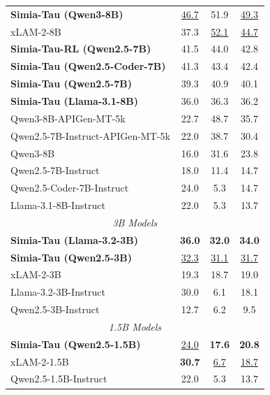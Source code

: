 \begin{table}
{\begin{tabular}{l|ccc}
\textbf{\textcolor{ourmodel}{Simia-Tau (Qwen3-8B)}} & \underline{\textcolor{ourmodel}{46.7}} & 51.9 & \underline{\textcolor{ourmodel}{49.3}} \\
xLAM-2-8B & 37.3 & \underline{52.1} & \underline{44.7} \\
\addlinespace[3pt]
\rowcolor{lightblue}
\textbf{\textcolor{ourmodel}{Simia-Tau-RL (Qwen2.5-7B)}} & \textcolor{ourmodel}{41.5} & \textcolor{ourmodel}{44.0} & \textcolor{ourmodel}{42.8} \\
\rowcolor{lightblue}
\textbf{\textcolor{ourmodel}{Simia-Tau (Qwen2.5-Coder-7B)}} & \textcolor{ourmodel}{41.3} & \textcolor{ourmodel}{43.4} & \textcolor{ourmodel}{42.4} \\
\addlinespace[3pt]
\rowcolor{lightblue}
\textbf{\textcolor{ourmodel}{Simia-Tau (Qwen2.5-7B)}} & \textcolor{ourmodel}{39.3} & \textcolor{ourmodel}{40.9} & \textcolor{ourmodel}{40.1} \\
\addlinespace[3pt]
\rowcolor{lightblue}
\textbf{\textcolor{ourmodel}{Simia-Tau (Llama-3.1-8B)}} & \textcolor{ourmodel}{36.0} & \textcolor{ourmodel}{36.3} & \textcolor{ourmodel}{36.2} \\
Qwen3-8B-APIGen-MT-5k & 22.7 & 48.7 & 35.7 \\
Qwen2.5-7B-Instruct-APIGen-MT-5k & 22.0 & 38.7 & 30.4 \\
Qwen3-8B & 16.0 & 31.6 & 23.8 \\
Qwen2.5-7B-Instruct & 18.0 & 11.4 & 14.7 \\
Qwen2.5-Coder-7B-Instruct & 24.0 & 5.3 & 14.7 \\
Llama-3.1-8B-Instruct & 22.0 & 5.3 & 13.7 \\
\midrule
\multicolumn{4}{c}{\textit{3B Models}} \\
\midrule
\rowcolor{lightblue}
\textbf{Simia-Tau (Llama-3.2-3B)} & \textbf{\textcolor{ourmodel}{36.0}} & \textbf{\textcolor{ourmodel}{32.0}} & \textbf{\textcolor{ourmodel}{34.0}} \\
\rowcolor{lightblue}
\textbf{\textcolor{ourmodel}{Simia-Tau (Qwen2.5-3B)}} & \underline{\textcolor{ourmodel}{32.3}} & \underline{\textcolor{ourmodel}{31.1}} & \underline{\textcolor{ourmodel}{31.7}} \\
xLAM-2-3B & 19.3 & 18.7 & 19.0 \\
Llama-3.2-3B-Instruct & 30.0 & 6.1 & 18.1 \\
Qwen2.5-3B-Instruct & 12.7 & 6.2 & 9.5 \\
\midrule
\multicolumn{4}{c}{\textit{1.5B Models}} \\
\midrule
\rowcolor{lightblue}
\textbf{\textcolor{ourmodel}{Simia-Tau (Qwen2.5-1.5B)}} & \underline{24.0} & \textbf{\textcolor{ourmodel}{17.6}} & \textbf{\textcolor{ourmodel}{20.8}} \\
xLAM-2-1.5B & \textbf{30.7} & \underline{6.7} & \underline{18.7} \\
Qwen2.5-1.5B-Instruct & 22.0 & 5.3 & 13.7 \\
\bottomrule
\end{tabular}
}
\vspace{-1em}
\end{table}